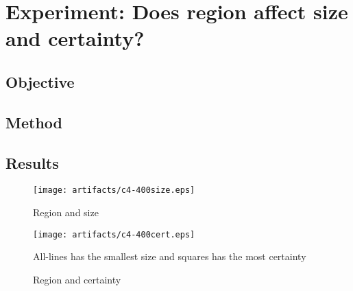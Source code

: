 \section{Experiment: Does region affect size and certainty?}
\subsection*{Objective}
\subsection*{Method}	
\subsection*{Results}
\begin{figure} [!ht]
\center
\texttt{[image: artifacts/c4-400size.eps]}
\caption{Region and size}
\end{figure}
\begin{figure} [!ht]
\center
\texttt{[image: artifacts/c4-400cert.eps]}
\caption{Region and certainty}

All-lines has the smallest size and squares has the most certainty
\end{figure}





